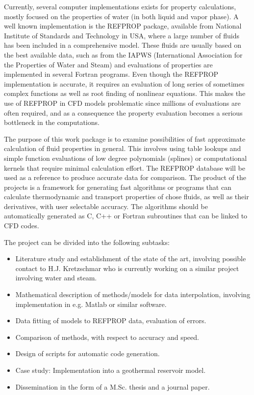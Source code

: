 \documentclass[12pt,a4paper]{article}
\begin{document}
Currently, several computer implementations exists for property calculations, mostly focused on the properties of 
water (in both liquid and vapor phase).  A well known implementation is the REFPROP package, available from National 
Institute of Standards and Technology in USA, where a large number of fluids has been included in a comprehensive 
model.  These fluids are usually based on the best available data, such as from the IAPWS (International Association 
for the Properties of Water and Steam) and evaluations of properties are implemented in several Fortran programs.  
Even though the REFPROP implementation is accurate, it requires an evaluation of long series of sometimes complex 
functions as well as root finding of nonlinear equations.  This makes the use of REFPROP in CFD models problematic 
since millions of evaluations are often required, and as a consequence the property evaluation becomes a serious 
bottleneck in the computations.

The purpose of this work package is to examine possibilities of fast approximate calculation of fluid properties in 
general. This involves using table lookups and simple function evaluations of low degree polynomials (splines) or 
computational kernels that require minimal calculation effort.  The REFPROP database will be used as a reference to 
produce accurate data for comparison.  The product of the projects is a framework for generating fast algorithms or 
programs that can calculate thermodynamic and transport properties of chose fluids, as well as their derivatives, with 
user selectable accuracy.  The algorithms should be automatically generated as C, C++ or Fortran subroutines that can 
be linked to CFD codes.

The project can be divided into the following subtasks:
\begin{itemize}
   \item   Literature study and establishment of the state of the art, involving possible contact to H.J. Kretzschmar 
   who is currently working on a similar project involving water and steam.
   \item   Mathematical description of methods/models for data interpolation, involving implementation in e.g. Matlab 
   or similar software.
   \item   Data fitting of models to REFPROP data, evaluation of errors.
   \item   Comparison of methods, with respect to accuracy and speed.
   \item   Design of scripts for automatic code generation.
   \item   Case study: Implementation into a geothermal reservoir model.
   \item   Dissemination in the form of a M.Sc. thesis and a journal paper.
\end{itemize}
\end{document}

